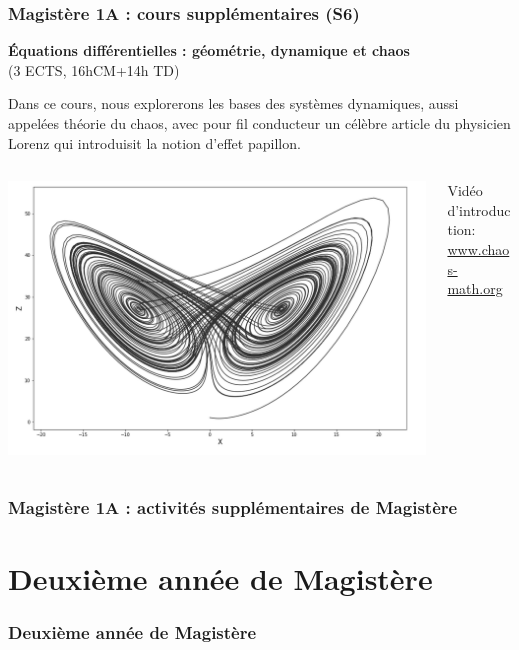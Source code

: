 \documentclass[slidetop,11pt]{beamer}
\begin{document}
\begin{frame}
\frametitle{Magistère 1A : cours supplémentaires (S6)}

\textbf{Équations différentielles : géométrie, dynamique et chaos}\\
(3 ECTS, 16hCM+14h TD)

Dans ce cours, nous explorerons les bases des systèmes dynamiques, aussi appelées \og théorie du chaos\fg, avec pour fil conducteur un célèbre article du physicien Lorenz qui introduisit la notion d'effet papillon.
\begin{columns}[c]
\begin{column}{6cm}
\includegraphics[scale=.2]{images/Lorenz-Attractor-in-2D-space.png}
\end{column}
\begin{column}{5cm}
Vidéo d'introduction: \\
\url{www.chaos-math.org}\\
\end{column}
\end{columns}


\end{frame}

\begin{frame}
\frametitle{Magistère 1A : activités supplémentaires de Magistère}
\end{frame}

 \section{Deuxième année de Magistère}
\begin{frame}
\frametitle{Deuxième année de Magistère}

\end{frame}
\end{document}
